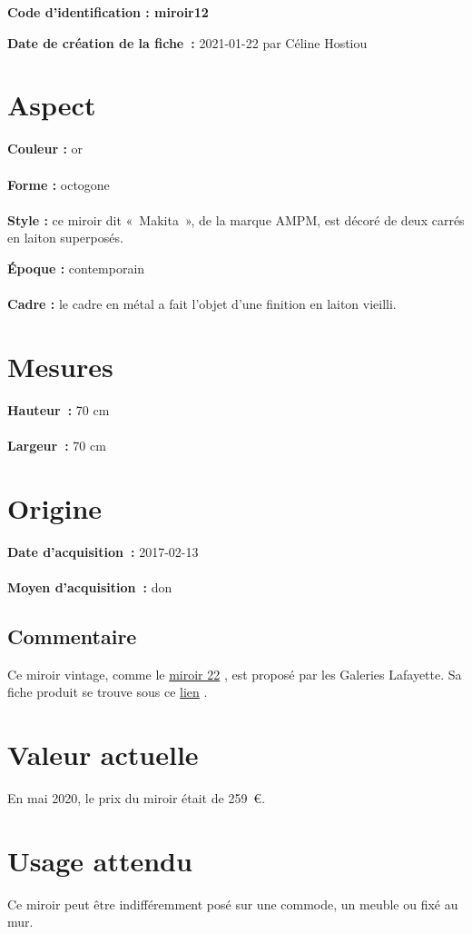 
     {\bf \huge Code d’identification : miroir12} \\
    \newline \hr \begin{center} 
       
    \end{center} 
    \begin{itemize}
    
    \footnotesize {\item {\bf Date de création de la fiche :} 2021-01-22
    {par Céline Hostiou}} 
    \end{itemize}
   \hr 
    \section* {Aspect} 
    {\bf \large Couleur :} or
    \\ \\ {\bf \large Forme :} octogone 
    \\ \\ {\bf \large Style :} 
            ce miroir dit « Makita », de la marque AMPM, est décoré de deux carrés en laiton superposés.
         
        {\bf \large Époque :} contemporain 
    \\ \\ {\bf \large Cadre :} le cadre en métal a fait l’objet d'une finition en laiton vieilli. 
    \section* {Mesures}
     {\bf \large Hauteur :} 70 cm
   \\ \\ {\bf \large Largeur :} 70 cm 
  
    \section* {Origine}
    {\bf \large Date d’acquisition :} 2017-02-13 \\ \\
    {\bf \large Moyen d’acquisition :} don
    \subsection* {Commentaire}
     Ce miroir vintage, comme le 
    \href{miroir22.xml}{miroir
                22}
  , est proposé par les Galeries Lafayette. Sa fiche produit se trouve sous ce 
    \href{https://www.galerieslafayette.com/p/miroir+metal+finition+vieillie+makita-ampm/300407151727/347}{lien}
  . 
    \section* {Valeur actuelle}
    En mai 2020, le prix du miroir était de 259 €.
    \section* {Usage attendu}
     Ce miroir peut être indifféremment posé sur une commode, un meuble ou fixé au mur.   
  